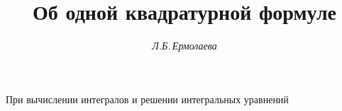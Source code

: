 









\newcommand{\tts}[1]{}







\setcounter{page}{25}















\author{\it Л.Б.\,Ермолаева}




\title{Об одной квадратурной формуле}





\date{}




\pagestyle{plain} %







\maketitle


\label{begin}





При вычислении интегралов и решении интегральных уравнений


